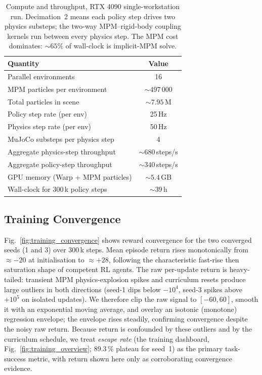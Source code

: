 \documentclass[conference]{IEEEtran}
\begin{document}
\begin{table}[!htbp]
  \centering
  \caption{Compute and throughput, RTX 4090 single-workstation run.
    Decimation~2 means each policy step drives two physics substeps; the
    two-way MPM--rigid-body coupling kernels run between every physics step.
    The MPM cost dominates: ${\sim}65\%$ of wall-clock is implicit-MPM solve.}
  \label{tab:compute}
  \renewcommand{\arraystretch}{1.15}
  \begin{tabular}{@{}lc@{}}
    \toprule
    \textbf{Quantity} & \textbf{Value} \\
    \midrule
    Parallel environments                    & 16 \\
    MPM particles per environment            & ${\sim}497\,000$ \\
    Total particles in scene                 & ${\sim}7.95$\,M \\
    Policy step rate (per env)               & 25\,Hz \\
    Physics step rate (per env)              & 50\,Hz \\
    MuJoCo substeps per physics step         & 4 \\
    Aggregate physics-step throughput        & ${\sim}680$\,steps/s \\
    Aggregate policy-step throughput         & ${\sim}340$\,steps/s \\
    GPU memory (Warp + MPM particles)        & ${\sim}5.4$\,GB \\
    Wall-clock for 300\,k policy steps       & ${\sim}39$\,h \\
    \bottomrule
  \end{tabular}
\end{table}

\subsection{Training Convergence}

Fig.~\ref{fig:training_convergence} shows reward convergence for the two
converged seeds (1 and 3) over 300\,k steps. Mean episode return rises
monotonically from ${\approx}{-}20$ at initialisation to ${\approx}{+}28$,
following the characteristic fast-rise then saturation shape of competent RL
agents. The raw per-update return is heavy-tailed: transient MPM
physics-explosion spikes and curriculum resets produce large outliers in both
directions (seed-1 dips below $-10^4$, seed-3 spikes above $+10^5$ on isolated
updates). We therefore clip the raw signal to $[-60,60]$, smooth it with an
exponential moving average, and overlay an isotonic (monotone) regression
envelope; the envelope rises steadily, confirming convergence despite the noisy
raw return. Because return is confounded by these outliers and by the curriculum
schedule, we treat \emph{escape rate}
(the training dashboard, Fig.~\ref{fig:training_overview}; $89.3\,\%$ plateau for
seed~1) as the primary task-success metric, with return shown here only as
corroborating convergence evidence.
\end{document}
